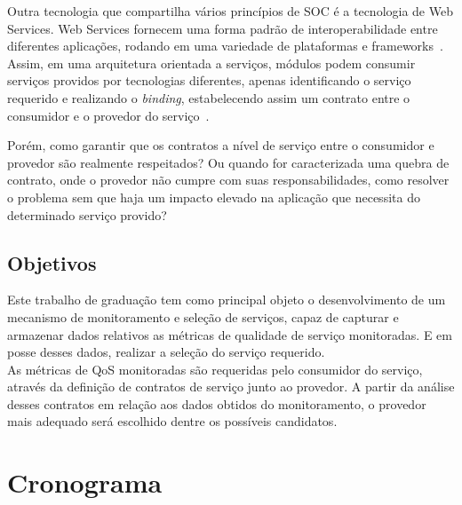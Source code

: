 Outra tecnologia que compartilha vários princípios de SOC é a tecnologia de Web Services. Web Services fornecem uma forma padrão de interoperabilidade entre diferentes aplicações, rodando em uma variedade de plataformas e frameworks~\cite{http://www.w3.org/2002/ws/}.\\


Assim, em uma arquitetura orientada a serviços, módulos podem consumir serviços providos por tecnologias diferentes, apenas identificando o serviço requerido e realizando o \textit{binding}, estabelecendo assim um contrato entre o consumidor e o provedor do serviço~\cite{http://www.oracle.com/technetwork/articles/javase/soa-142870.html}.  

Porém, como garantir que os contratos a nível de serviço entre o consumidor e provedor são realmente respeitados? Ou quando for caracterizada uma quebra de contrato, onde o provedor não cumpre com suas responsabilidades, como resolver o problema sem que haja um impacto elevado na aplicação que necessita do determinado serviço provido?

\newpage
\section{Objetivos}
\label{pr:objectives}

Este trabalho de graduação tem como principal objeto o desenvolvimento de um mecanismo de monitoramento e seleção de serviços, capaz de capturar e armazenar dados relativos as métricas de qualidade de serviço monitoradas. E em posse desses dados, realizar a seleção do serviço requerido.
\\

As métricas de QoS monitoradas são requeridas pelo consumidor do serviço, através da definição de contratos de serviço junto ao provedor. A partir da análise desses contratos em relação aos dados obtidos do monitoramento, o provedor mais adequado será escolhido dentre os possíveis candidatos.

\newpage
\chapter{Cronograma}
\label{pr:chrono}

